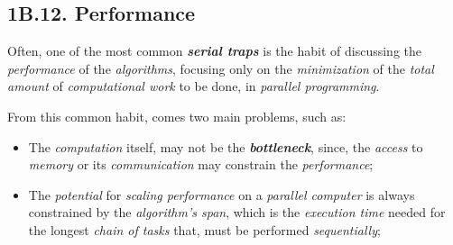 \subsection*{\large{\textbf{1B.12. Performance}}}

\noindent Often, one of the most common \textbf{\emph{serial traps}} is the habit of discussing the \emph{performance} of the \emph{algorithms}, focusing only on the \emph{minimization} of the \emph{total amount} of \emph{computational work} to be done, in \emph{parallel programming}.

\vspace{0.35cm}

\noindent From this common habit, comes two main problems, such as:
\vspace{-0.2cm}
\begin{itemize}
    \item The \emph{computation} itself, may not be the \textbf{\emph{bottleneck}}, since, the \emph{access} to \emph{memory} or its \emph{communication} may constrain the \emph{performance};
    \vspace{-0.1cm}
    \item The \emph{potential} for \emph{scaling performance} on a \emph{parallel computer} is always constrained by the \emph{algorithm's span}, which is the \emph{execution time} needed for the longest \emph{chain of tasks} that, must be performed \emph{sequentially};
\end{itemize}